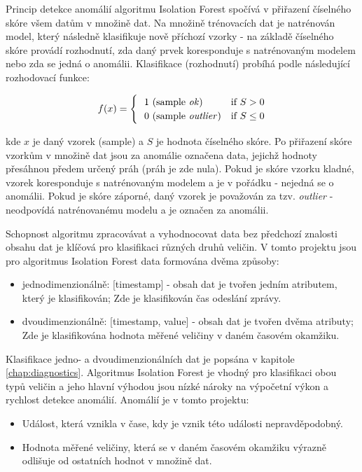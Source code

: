 Princip detekce anomálií algoritmu Isolation Forest spočívá v přiřazení číselného skóre všem datům v množině dat. Na množině trénovacích dat je natrénován model, který následně klasifikuje nově příchozí vzorky - na základě číselného skóre provádí rozhodnutí, zda daný prvek koresponduje s natrénovaným modelem nebo zda se jedná o anomálii. Klasifikace (rozhodnutí) probíhá podle následující rozhodovací funkce:

\[
    f(x)= 
\begin{cases}
     \ \ 1 \ (\text{sample \textit{ok}}) & \text{if } S > 0 \\
     \ \ 0 \ (\text{sample \textit{outlier}}) & \text{if } S \leq 0 \\
\end{cases}
\]

kde $x$ je daný vzorek (sample) a $S$ je hodnota číselného skóre. Po přiřazení skóre vzorkům v množině dat jsou za anomálie označena data, jejichž hodnoty přesáhnou předem určený práh (práh je zde nula). Pokud je skóre vzorku kladné, vzorek koresponduje s natrénovaným modelem a je v pořádku - nejedná se o anomálii. Pokud je skóre záporné, daný vzorek je považován za tzv. \textit{outlier} - neodpovídá natrénovanému modelu a je označen za anomálii. \par
Schopnost algoritmu zpracovávat a vyhodnocovat data bez předchozí znalosti obsahu dat je klíčová pro klasifikaci různých druhů veličin. V tomto projektu jsou pro algoritmus Isolation Forest data formována dvěma způsoby: 

\begin{itemize}
	\item jednodimenzionálně: [timestamp] - obsah dat je tvořen jedním atributem, který je klasifikován; Zde je klasifikován čas odeslání zprávy. 
	\item dvoudimenzionálně: [timestamp, value] - obsah dat je tvořen dvěma atributy; Zde je klasifikována hodnota měřené veličiny v daném časovém okamžiku.
\end{itemize}

Klasifikace jedno- a dvoudimenzionálních dat je popsána v kapitole \cref{chap:diagnostics}. Algoritmus Isolation Forest je vhodný pro klasifikaci obou typů veličin a jeho hlavní výhodou jsou nízké nároky na výpočetní výkon a rychlost detekce anomálií.  Anomálií je v tomto projektu:

\begin{itemize}
	\item Událost, která vznikla v čase, kdy je vznik této události nepravděpodobný. 
	\item Hodnota měřené veličiny, která se v daném časovém okamžiku výrazně odlišuje od ostatních hodnot v množině dat.
\end{itemize}

